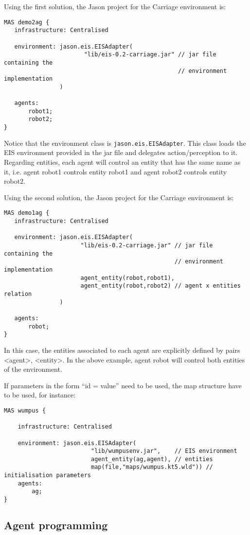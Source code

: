 \documentclass{article}
\begin{document}
Using the first solution, the Jason project for the Carriage environment is:
\begin{verbatim}
MAS demo2ag {
   infrastructure: Centralised

   environment: jason.eis.EISAdapter(
                       "lib/eis-0.2-carriage.jar" // jar file containing the 
                                                  // environment implementation
                )

   agents:
       robot1;
       robot2;
}
\end{verbatim}
Notice that the environment class is
\texttt{jason.eis.EISAdapter}. This class loads the EIS environment
provided in the jar file and delegates action/perception to
it. Regarding entities, each agent will control an entity that has the
same name as it, i.e. agent robot1 controls entity robot1 and agent
robot2 controls entity robot2.

Using the second solution, the Jason project for the Carriage environment is:
\begin{verbatim}
MAS demo1ag {
   infrastructure: Centralised

   environment: jason.eis.EISAdapter(
                      "lib/eis-0.2-carriage.jar" // jar file containing the 
                                                 // environment implementation
                      agent_entity(robot,robot1), 
                      agent_entity(robot,robot2) // agent x entities relation  
                )

   agents:
       robot; 
}
\end{verbatim}
In this case, the entities associated to each agent are explicitly
defined by pairs <agent>, <entity>. In the above example, agent robot
will control both entities of the environment.

If parameters in the form ``id = value'' need to be used, the map
structure have to be used, for instance:
\begin{verbatim}
MAS wumpus {

    infrastructure: Centralised

    environment: jason.eis.EISAdapter(
                         "lib/wumpusenv.jar",    // EIS environment
                         agent_entity(ag,agent), // entities
                         map(file,"maps/wumpus.kt5.wld")) // initialisation parameters	
    agents:
        ag;
}
\end{verbatim}

\subsection*{Agent programming}
\end{document}
